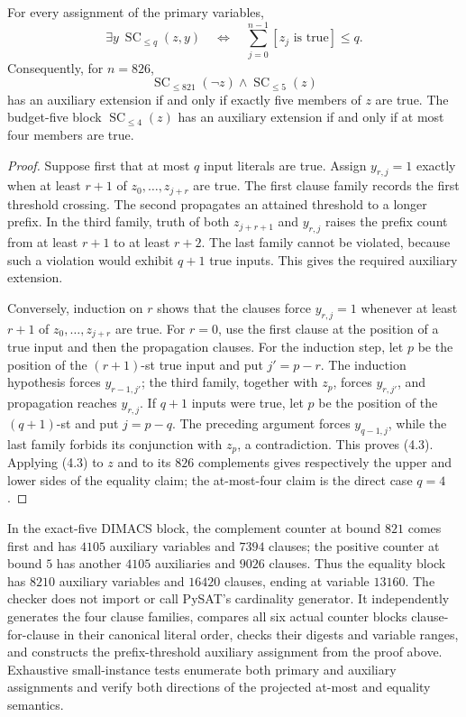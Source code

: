 \begin{lemma}
\label{lem:seqcounter-projection}
For every assignment of the primary variables,
\[
 \exists y\ \operatorname{SC}_{\le q}(z,y)\quad\Longleftrightarrow\quad
 \sum_{j=0}^{n-1}[z_j\text{ is true}]\le q.       \tag{4.3}
\]
Consequently, for \(n=826\),
\[
 \operatorname{SC}_{\le821}(\neg z)\land
 \operatorname{SC}_{\le5}(z)
\]
has an auxiliary extension if and only if exactly five members of \(z\) are
true.  The budget-five block \(\operatorname{SC}_{\le4}(z)\) has an auxiliary
extension if and only if at most four members are true.
\end{lemma}

\begin{proof}
Suppose first that at most \(q\) input literals are true.  Assign
\(y_{r,j}=1\) exactly when at least \(r+1\) of
\(z_0,\ldots,z_{j+r}\) are true.  The first clause family records the first
threshold crossing.  The second propagates an attained threshold to a longer
prefix.  In the third family, truth of both \(z_{j+r+1}\) and \(y_{r,j}\)
raises the prefix count from at least \(r+1\) to at least \(r+2\).  The last
family cannot be violated, because such a violation would exhibit \(q+1\)
true inputs.  This gives the required auxiliary extension.

Conversely, induction on \(r\) shows that the clauses force \(y_{r,j}=1\)
whenever at least \(r+1\) of \(z_0,\ldots,z_{j+r}\) are true.  For \(r=0\),
use the first clause at the position of a true input and then the propagation
clauses.  For the induction step, let \(p\) be the position of the
\((r+1)\)-st true input and put \(j'=p-r\).  The induction hypothesis forces
\(y_{r-1,j'}\); the third family, together with \(z_p\), forces \(y_{r,j'}\),
and propagation reaches \(y_{r,j}\).  If \(q+1\) inputs were true, let \(p\)
be the position of the \((q+1)\)-st and put \(j=p-q\).  The preceding argument
forces \(y_{q-1,j}\), while the last family forbids its conjunction with
\(z_p\), a contradiction.  This proves (4.3).  Applying (4.3) to \(z\) and
to its \(826\) complements gives respectively the upper and lower sides of
the equality claim; the at-most-four claim is the direct case \(q=4\).
\end{proof}

In the exact-five DIMACS block, the complement counter at bound \(821\) comes
first and has \(4105\) auxiliary variables and \(7394\) clauses; the positive
counter at bound \(5\) has another \(4105\) auxiliaries and \(9026\) clauses.
Thus the equality block has \(8210\) auxiliary variables and \(16420\) clauses,
ending at variable \(13160\).  The checker
 does not import or call PySAT's
cardinality generator.  It independently generates the four clause families,
compares all six actual counter blocks clause-for-clause in their canonical
literal order, checks their digests and variable ranges, and constructs the
prefix-threshold auxiliary assignment from the proof above.  Exhaustive
small-instance tests enumerate both primary and auxiliary assignments and
verify both directions of the projected at-most and equality semantics.

